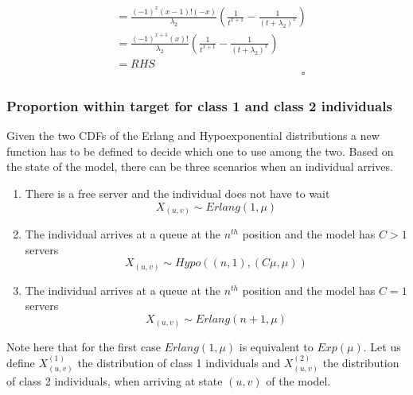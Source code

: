 \begin{itemize}
\begin{enumerate}
\begin{equation*}
\begin{split}
                &= \frac{(-1)^x (x-1)! (-x)}{\lambda_2} \left(
                    \frac{1}{t^{x+1}} - \frac{1}{(t + \lambda_2)^x}
                \right) \\
                &= \frac{(-1)^{x+1} (x)!}{\lambda_2} \left(
                    \frac{1}{t^{x+1}} - \frac{1}{(t + \lambda_2)^x}
                \right) \\
                & = RHS \\
                & \hspace{7cm} \square
            \end{split}
        \end{equation*}
    \end{enumerate}
\end{itemize}

\subsubsection{Proportion within target for class 1 and class 2 individuals}

Given the two CDFs of the Erlang and Hypoexponential distributions a new 
function has to be defined to decide which one to use among the two.
Based on the state of the model, there can be three scenarios when an individual
arrives.
\begin{enumerate}
    \item There is a free server and the individual does not have to wait
    \begin{equation*}
        X_{(u,v)} \sim Erlang(1, \mu) 
    \end{equation*}
    \item The individual arrives at a queue at the \(n^{th}\) position and the 
    model has \(C > 1\) servers
    \begin{equation*}
        X_{(u,v)} \sim Hypo((n, 1), (C \mu, \mu)) 
    \end{equation*}
    \item The individual arrives at a queue at the \(n^{th}\) position and the 
    model has \(C = 1\) servers
    \begin{equation*}
        X_{(u,v)} \sim Erlang(n + 1, \mu) 
    \end{equation*}
\end{enumerate}

Note here that for the first case \(Erlang(1, \mu)\) is equivalent to 
\(Exp(\mu)\). 
Let us define \(X_{(u,v)}^{(1)}\) the distribution of class 1 individuals and
\(X_{(u,v)}^{(2)}\) the distribution of class 2 individuals, when arriving at 
state \((u,v)\) of the model.

